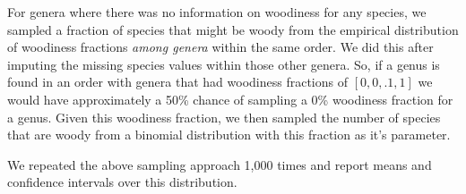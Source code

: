 \documentclass[12pt]{article}
\begin{document}
For genera where there was no information on woodiness for any
species, we sampled a fraction of species that might be woody from the
empirical distribution of woodiness fractions \textit{among genera}
within the same order.  We did this after imputing the missing species
values within those other genera.  So, if a genus is found in an order
with genera that had woodiness fractions of $[0, 0, .1, 1]$ we would
have approximately a 50\% chance of sampling a 0\% woodiness fraction
for a genus.  Given this woodiness fraction, we then sampled the
number of species that are woody from a binomial distribution with
this fraction as it's parameter.

We repeated the above sampling approach 1,000 times and report means
and confidence intervals over this distribution.



\end{document}
